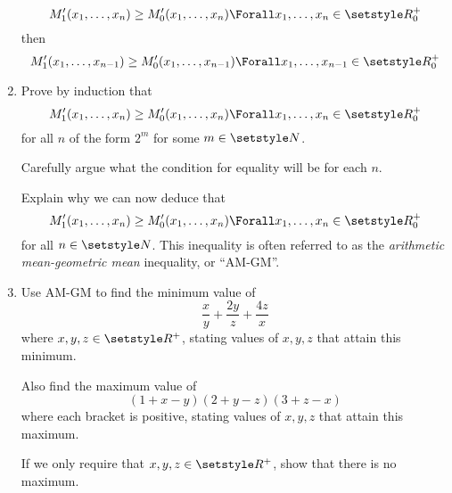 \begin{enumerate}
  \begin{equation*}
   M_1'(x_1, \dotsc, x_n) \ge M_0'(x_1, \dotsc, x_n)
    \Forall x_1, \dotsc, x_n \in \Reals_0^+
  \end{equation*}
  then
  \begin{equation*}
   M_1'(x_1, \dotsc, x_{n - 1}) \ge M_0'(x_1, \dotsc, x_{n - 1})
    \Forall x_1, \dotsc, x_{n - 1} \in \Reals_0^+
  \end{equation*}
 \item
  Prove by induction that
  \begin{equation*}
   M_1'(x_1, \dotsc, x_n) \ge M_0'(x_1, \dotsc, x_n)
    \Forall x_1, \dotsc, x_n \in \Reals_0^+
  \end{equation*}
  for all \(n\) of the form \(2^m\) for some \(m \in \Naturals\).

  Carefully argue what the condition for equality will be for each \(n\).

  Explain why we can now deduce that
  \begin{equation*}
   M_1'(x_1, \dotsc, x_n) \ge M_0'(x_1, \dotsc, x_n)
    \Forall x_1, \dotsc, x_n \in \Reals_0^+
  \end{equation*}
  for all \(n \in \Naturals\). This inequality is often referred to as the
  \emph{arithmetic mean-geometric mean} inequality, or ``AM-GM''.
 \item
  Use AM-GM to find the minimum value of
  \begin{equation*}
   \frac xy + \frac{2y}z + \frac{4z}x
  \end{equation*}
  where \(x, y, z \in \Reals^+\), stating values of \(x, y, z\) that attain this
  minimum.

  Also find the maximum value of
  \begin{equation*}
   (1 + x - y)(2 + y - z)(3 + z - x)
  \end{equation*}
  where each bracket is positive, stating values of \(x, y, z\) that attain this
  maximum.

  If we only require that \(x, y, z \in \Reals^+\), show that there is no
  maximum.
\end{enumerate}
